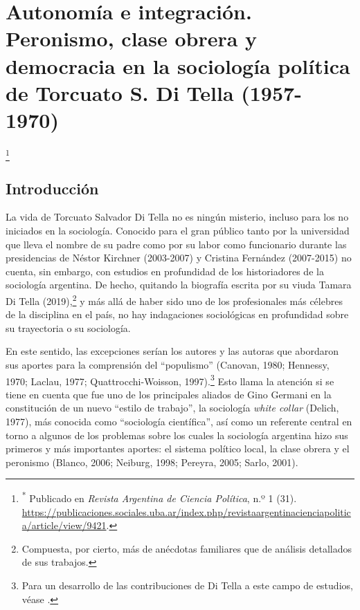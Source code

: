 \chapter{Autonomía e integración. Peronismo, clase obrera y democracia en la sociología política de Torcuato S. Di Tella (1957-1970)}

\footnote{\textsuperscript{*} Publicado en \emph{Revista Argentina de Ciencia Política}, n.º 1 (31). \url{https://publicaciones.sociales.uba.ar/index.php/revistaargentinacienciapolitica/article/view/9421}.}

\section{Introducción}

La vida de Torcuato Salvador Di Tella no es ningún misterio, incluso para los no iniciados en la sociología. Conocido para el gran público tanto por la universidad que lleva el nombre de su padre como por su labor como funcionario durante las presidencias de Néstor Kirchner (2003-2007) y Cristina Fernández (2007-2015) no cuenta, sin embargo, con estudios en profundidad de los historiadores de la sociología argentina. De hecho, quitando la biografía escrita por su viuda Tamara Di Tella (2019),\footnote{Compuesta, por cierto, más de anécdotas familiares que de análisis detallados de sus trabajos.} y más allá de haber sido uno de los profesionales más célebres de la disciplina en el país, no hay indagaciones sociológicas en profundidad sobre su trayectoria o su sociología.

En este sentido, las excepciones serían los autores y las autoras que abordaron sus aportes para la comprensión del ``populismo'' (Canovan, 1980; Hennessy, 1970; Laclau, 1977; Quattrocchi-Woisson, 1997).\footnote{Para un desarrollo de las contribuciones de Di Tella a este campo de estudios, véase \textcite[234-242]{278-AMARAL2018}.} Esto llama la atención si se tiene en cuenta que fue uno de los principales aliados de Gino Germani en la constitución de un nuevo ``estilo de trabajo'', la sociología \emph{white collar} (Delich, 1977), más conocida como ``sociología científica'', así como un referente central en torno a algunos de los problemas sobre los cuales la sociología argentina hizo sus primeros y más importantes aportes: el sistema político local, la clase obrera y el peronismo (Blanco, 2006; Neiburg, 1998; Pereyra, 2005; Sarlo, 2001).

